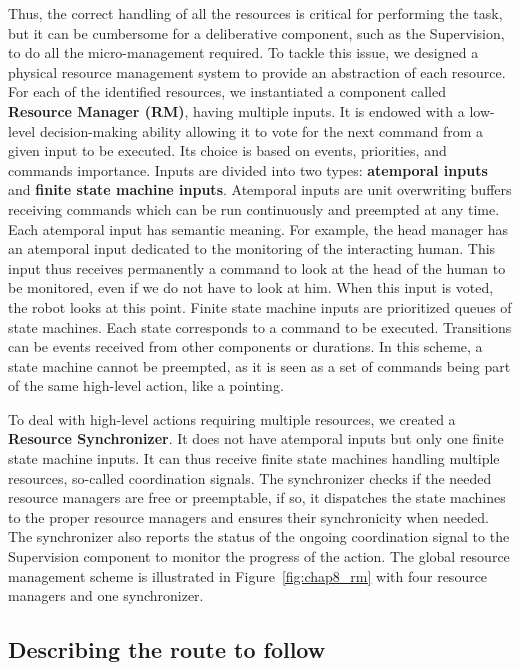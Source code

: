 Thus, the correct handling of all the resources is critical for performing the task, but it can be cumbersome for a deliberative component, such as the Supervision, to do all the micro-management required. To tackle this issue, we designed a physical resource management system to provide an abstraction of each resource. For each of the identified resources, we instantiated a component called \textbf{Resource Manager (RM)}, having multiple inputs. It is endowed with a low-level decision-making ability allowing it to vote for the next command from a given input to be executed. Its choice is based on events, priorities, and commands importance. Inputs are divided into two types: \textbf{atemporal inputs} and \textbf{finite state machine inputs}. Atemporal inputs are unit overwriting buffers receiving commands which can be run continuously and preempted at any time. Each atemporal input has semantic meaning. For example, the head manager has an atemporal input dedicated to the monitoring of the interacting human. This input thus receives permanently a command to look at the head of the human to be monitored, even if we do not have to look at him. When this input is voted, the robot looks at this point. Finite state machine inputs are prioritized queues of state machines. Each state corresponds to a command to be executed. Transitions can be events received from other components or durations. In this scheme, a state machine cannot be preempted, as it is seen as a set of commands being part of the same high-level action, like a pointing.

To deal with high-level actions requiring multiple resources, we created a \textbf{Resource Synchronizer}. It does not have atemporal inputs but only one finite state machine inputs. It can thus receive finite state machines handling multiple resources, so-called coordination signals. The synchronizer checks if the needed resource managers are free or preemptable, if so, it dispatches the state machines to the proper resource managers and ensures their synchronicity when needed. The synchronizer also reports the status of the ongoing coordination signal to the Supervision component to monitor the progress of the action.
The global resource management scheme is illustrated in Figure~\ref{fig:chap8_rm} with four resource managers and one synchronizer.

\subsection{Describing the route to follow}


